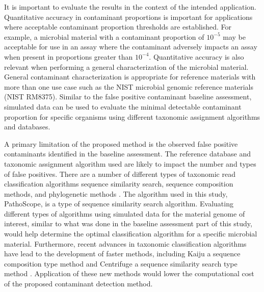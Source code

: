 \documentclass[fleqn,10pt,lineno]{wlpeerj}\usepackage[]{graphicx}\usepackage[]{color}
\begin{document}
It is important to evaluate the results in the context of the intended application.
Quantitative accuracy in contaminant proportions is important for applications where acceptable contaminant proportion thresholds are established.
For example, a microbial material with a contaminant proportion of $10^{-5}$ may be acceptable for use in an assay where the contaminant adversely impacts an assay when present in proportions greater than $10^{-4}$.
Quantitative accuracy is also relevant when performing a general characterization of the microbial material.
General contaminant characterization is appropriate for reference materials with more than one use case such as the NIST microbial genomic reference materials (NIST RM8375)\citep{olson2016pepr}.
Similar to the false positive contaminant baseline assessment,
simulated data can be used to evaluate the minimal detectable contaminant proportion for specific organisms using different taxonomic assignment algorithms and databases.

A primary limitation of the proposed method is the observed false positive contaminants identified in the baseline assessment. 
The reference database and taxonomic assignment algorithm used are likely to impact the number and types of false positives. 
There are a number of different types of taxonomic read classification algorithms sequence similarity search, sequence composition methods, and phylogenetic methods \citep{Bazinet2012}. 
The algorithm used in this study, PathoScope, is a type of sequence similarity search algorithm. 
Evaluating different types of algorithms using simulated data for the material genome of interest, similar to what was done in the baseline assessment part of this study, would help determine the optimal classification algorithm for a specific microbial material. 
Furthermore, recent advances in taxonomic classification algorithms have lead to the development of faster methods, including Kaiju a sequence composition type method and Centrifuge a sequence similarity search type method \citep{menzel2016fast,Kim2016-ir}. 
Application of these new methods would lower the computational cost of the proposed contaminant detection method. 
\end{document}
